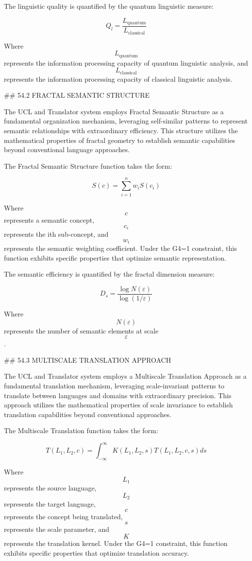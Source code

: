 The linguistic quality is quantified by the quantum linguistic measure:

$$ Q_l = \frac{L_{\text{quantum}}}{L_{\text{classical}}} $$

Where $$ L_{\text{quantum}} $$ represents the information processing capacity of quantum linguistic analysis, and $$ L_{\text{classical}} $$ represents the information processing capacity of classical linguistic analysis.

## 54.2 FRACTAL SEMANTIC STRUCTURE

The UCL and Translator system employs Fractal Semantic Structure as a fundamental organization mechanism, leveraging self-similar patterns to represent semantic relationships with extraordinary efficiency. This structure utilizes the mathematical properties of fractal geometry to establish semantic capabilities beyond conventional language approaches.

The Fractal Semantic Structure function takes the form:

$$ S(c) = \sum_{i=1}^{n} w_i S(c_i) $$

Where $$ c $$ represents a semantic concept, $$ c_i $$ represents the ith sub-concept, and $$ w_i $$ represents the semantic weighting coefficient. Under the G4=1 constraint, this function exhibits specific properties that optimize semantic representation.

The semantic efficiency is quantified by the fractal dimension measure:

$$ D_s = \frac{\log N(ε)}{\log(1/ε)} $$

Where $$ N(ε) $$ represents the number of semantic elements at scale $$ ε $$.

## 54.3 MULTISCALE TRANSLATION APPROACH

The UCL and Translator system employs a Multiscale Translation Approach as a fundamental translation mechanism, leveraging scale-invariant patterns to translate between languages and domains with extraordinary precision. This approach utilizes the mathematical properties of scale invariance to establish translation capabilities beyond conventional approaches.

The Multiscale Translation function takes the form:

$$ T(L_1, L_2, c) = \int_{-\infty}^{\infty} K(L_1, L_2, s) T(L_1, L_2, c, s) ds $$

Where $$ L_1 $$ represents the source language, $$ L_2 $$ represents the target language, $$ c $$ represents the concept being translated, $$ s $$ represents the scale parameter, and $$ K $$ represents the translation kernel. Under the G4=1 constraint, this function exhibits specific properties that optimize translation accuracy.


